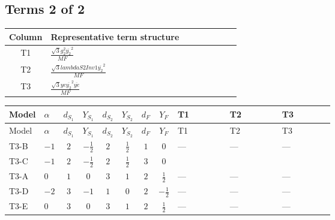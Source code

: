 \documentclass[8pt]{article}
\begin{document}
\begin{landscape}
\subsection*{Terms 2 of 2}
\begin{center}
\begin{tabular}{@{}c >{\raggedright\arraybackslash}p{0.82\linewidth}@{}}
\toprule
Column & Representative term structure \\
\midrule
T1 & \(\displaystyle \frac{\sqrt{3} g_{2}^{2} \overline{y_{2}}^{2}}{MF}\) \\
\midrule
T2 & \(\displaystyle \frac{\sqrt{3} lambdaS2Inv1 \overline{y_{2}}^{2}}{MF}\) \\
\midrule
T3 & \(\displaystyle \frac{\sqrt{3} ye \overline{y_{2}}^{2} \overline{ye}}{MF}\) \\
\midrule
\bottomrule
\end{tabular}
\end{center}
\smallskip
\tiny
\begin{longtable}{@{}llcccccc >{\raggedright\arraybackslash}p{0.21\linewidth} >{\raggedright\arraybackslash}p{0.21\linewidth} >{\raggedright\arraybackslash}p{0.21\linewidth}@{}}
\toprule
Model & $\alpha$ & $d_{S_1}$ & $Y_{S_1}$ & $d_{S_2}$ & $Y_{S_2}$ & $d_F$ & $Y_F$ & T1 & T2 & T3 \\
\midrule
\endfirsthead
\toprule
Model & $\alpha$ & $d_{S_1}$ & $Y_{S_1}$ & $d_{S_2}$ & $Y_{S_2}$ & $d_F$ & $Y_F$ & T1 & T2 & T3 \\
\midrule
\endhead
T3-B & $-1$ & $2$ & $-\frac{1}{2}$ & $2$ & $\frac{1}{2}$ & $1$ & $0$ & --- & --- & --- \\
\midrule
T3-C & $-1$ & $2$ & $-\frac{1}{2}$ & $2$ & $\frac{1}{2}$ & $3$ & $0$ & \scriptsize\adjustbox{max width=\linewidth}{$\begin{gathered} \frac{\sqrt{3} g_{2}^{2} \overline{y_{2}}^{2}}{4 MF}\end{gathered}$} & \scriptsize\adjustbox{max width=\linewidth}{$\begin{gathered} \frac{\sqrt{3} lambdaS2Inv1 \overline{y_{2}}^{2}}{6 MF}\end{gathered}$} & \scriptsize\adjustbox{max width=\linewidth}{$\begin{gathered} - \frac{\sqrt{3} ye \overline{y_{2}}^{2} \overline{ye}}{12 MF}\end{gathered}$} \\
\midrule
T3-A & $0$ & $1$ & $0$ & $3$ & $1$ & $2$ & $\frac{1}{2}$ & --- & --- & --- \\
\midrule
T3-D & $-2$ & $3$ & $-1$ & $1$ & $0$ & $2$ & $-\frac{1}{2}$ & --- & --- & --- \\
\midrule
T3-E & $0$ & $3$ & $0$ & $3$ & $1$ & $2$ & $\frac{1}{2}$ & --- & --- & --- \\
\midrule
\bottomrule
\end{longtable}
\clearpage

\end{landscape}
\end{document}
